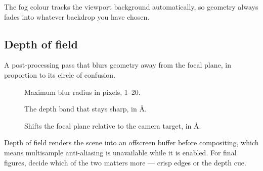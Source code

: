 The fog colour tracks the viewport background automatically, so geometry
always fades into whatever backdrop you have chosen.

\subsection{Depth of field}

A post-processing pass that blurs geometry away from the focal plane, in
proportion to its circle of confusion.

\begin{description}
  \item[] Maximum blur radius in pixels, 1--20.
  \item[] The depth band that stays sharp, in \AA{}.
  \item[] Shifts the focal plane relative to the camera
    target, in \AA{}.
\end{description}

\begin{calnote}
Depth of field renders the scene into an offscreen buffer before
compositing, which means multisample anti-aliasing is unavailable while it
is enabled. For final figures, decide which of the two matters more ---
crisp edges or the depth cue.
\end{calnote}
